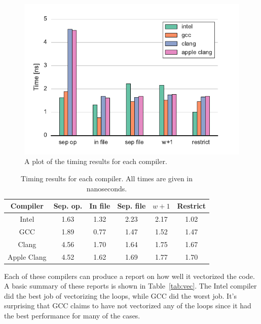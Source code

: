 \documentclass{article}
\begin{document}
    \begin{figure}
        \centering
        \includegraphics{barplot.pdf}
        \caption{A plot of the timing results for each compiler.}
        \label{fig:results}
    \end{figure}

    \begin{table}
        \centering
        \begin{tabular}{cccccc}
            \toprule
            Compiler    & Sep. op. & In file & Sep. file & $w+1$ & Restrict \\
            \midrule
            Intel       & 1.63     & 1.32    & 2.23      & 2.17  & 1.02     \\
            GCC         & 1.89     & 0.77    & 1.47      & 1.52  & 1.47     \\
            Clang       & 4.56     & 1.70    & 1.64      & 1.75  & 1.67     \\
            Apple Clang & 4.52     & 1.62    & 1.69      & 1.77  & 1.70     \\
            \bottomrule
        \end{tabular}
        \caption{Timing results for each compiler. All times are given in nanoseconds.}
        \label{tab:results}
    \end{table}

    Each of these compilers can produce a report on how well it vectorized the code. A basic summary of these reports is shown in Table~\ref{tab:vec}. The Intel compiler did the best job of vectorizing the loops, while GCC did the worst job. It's surprising that GCC claims to have not vectorized any of the loops since it had the best performance for many of the cases.
\end{document}
